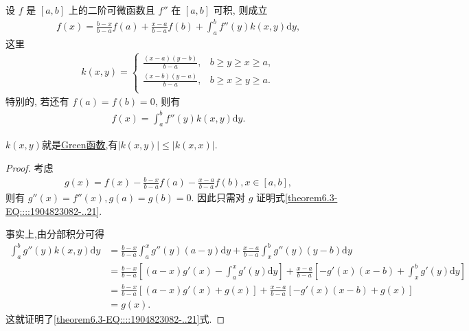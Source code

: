 \documentclass[../../main.tex]{subfiles}%
\begin{document}
\begin{theorem}[带积分型余项的Lagrange插值公式]\label{theorem:带积分型余项的Lagrange插值公式}
设 $f$ 是 $[a,b]$ 上的二阶可微函数且 $f''$ 在 $[a,b]$ 可积, 则成立
\begin{align*}
f(x) = \frac{b-x}{b-a} f(a) + \frac{x-a}{b-a} f(b) + \int_{a}^{b} f''(y) k(x,y) \mathrm{d}y,
\end{align*}
这里
\begin{align*}
k(x,y)=\begin{cases}
\frac{\left( x-a \right) \left( y-b \right)}{b-a},&		b\geqslant y\geqslant x\geqslant a,\\
\frac{\left( x-b \right) \left( y-a \right)}{b-a},&		b\geqslant x\geqslant y\geqslant a.\\
\end{cases}
\end{align*}
特别的, 若还有 $f(a) = f(b) = 0$, 则有
\begin{align}
f(x) = \int_{a}^{b} f''(y) k(x,y) \mathrm{d}y.\label{theorem6.3-EQ::::1904823082-..21}
\end{align}
\end{theorem}
\begin{note}
$k(x,y)$就是\hyperref[theorem:Green函数的性质]{Green函数},有$|k(x,y)|\leqslant  |k(x,x)|$.
\end{note}
\begin{proof}
考虑
\begin{align*}
g(x) = f(x) - \frac{b-x}{b-a} f(a) - \frac{x-a}{b-a} f(b), x \in [a,b],
\end{align*}
则有 $g''(x) = f''(x), g(a) = g(b) = 0$. 因此只需对 $g$ 证明式\eqref{theorem6.3-EQ::::1904823082-..21}.

事实上,由分部积分可得
\begin{align*}
\int_{a}^{b} g''(y) k(x,y) \mathrm{d}y &= \frac{b-x}{b-a} \int_{a}^{x} g''(y) (a-y) \mathrm{d}y + \frac{x-a}{b-a} \int_{x}^{b} g''(y) (y-b) \mathrm{d}y \\
&= \frac{b-x}{b-a} \left[ (a-x) g'(x) - \int_{a}^{x} g'(y) \mathrm{d}y \right] + \frac{x-a}{b-a} \left[ -g'(x) (x-b) + \int_{x}^{b} g'(y) \mathrm{d}y \right] \\
&= \frac{b-x}{b-a} [(a-x) g'(x) + g(x)] + \frac{x-a}{b-a} [-g'(x) (x-b) + g(x)] \\
&= g(x).
\end{align*}
这就证明了\eqref{theorem6.3-EQ::::1904823082-..21}式.
\end{proof}
\end{document}
